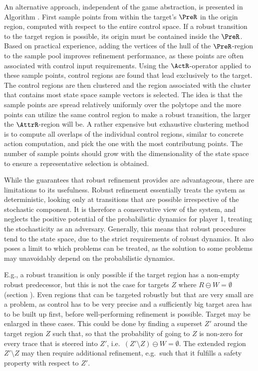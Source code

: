     An alternative approach, independent of the game abstraction, is presented in Algorithm .
    First sample points from within the target's $\PreR$ in the origin region, computed with respect to the entire control space.
    If a robust transition to the target region is possible, its origin must be contained inside the $\PreR$.
    Based on practical experience, adding the vertices of the hull of the $\PreR$-region to the sample pool improves refinement performance, as these points are often associated with  control input requirements.
    Using the $\ActR$-operator applied to these sample points, control regions are found that lead exclusively to the target.
    The control regions are then clustered and the region associated with the cluster that contains most state space sample vectors is selected.
    The idea is that the sample points are spread relatively uniformly over the polytope and the more points can utilize the same control region to make a robust transition, the larger the $\AttrR$-region will be.
    A rather expensive but exhaustive clustering method is to compute all overlaps of the individual control regions, similar to concrete action computation, and pick the one with the most contributung points.
    The number of sample points should grow with the dimensionality of the state space to ensure a representative selection is obtained.

\stopsubsection


\startsubsection[title={Limitations of Robust Refinement},reference=sec:refinement-robust-limitations]

    While the guarantees that robust refinement provides are advantageous, there are limitations to its usefulness.
    Robust refinement essentially treats the system as deterministic, looking only at transitions that are possible irrespective of the stochastic component.
    It is therefore a conservative view of the system, and neglects the positive potential of the probabilistic dynamics for player 1, treating the stochasticity as an adversary.
    Generally, this means that robust procedures tend to  the state space, due to the strict requirements of robust dynamics.
    It also poses a limit to which problems can be treated, as the solution to some problems may unavoidably depend on the probabilistic dynamics.

    E.g., a robust transition is only possible if the target region has a non-empty robust predecessor, but this is not the case for targets $Z$ where $R \ominus W = \emptyset$ (section ).
    Even regions that can be targeted robustly but that are very small are a problem, as control has to be very precise and a sufficiently big target area has to be built up first, before well-performing refinement is possible.
    Target may be enlarged in these cases.
    This could be done by finding a superset $Z'$ around the target region $Z$ such that, so that the probability of going to $Z$ is non-zero for every trace that is steered into $Z'$, i.e.\ $(Z' \setminus Z) \ominus W = \emptyset$.
    The extended region $Z' \setminus Z$ may then require additional refinement, e.g.\ such that it fulfills a safety property with respect to $Z'$.

\stopsubsection

